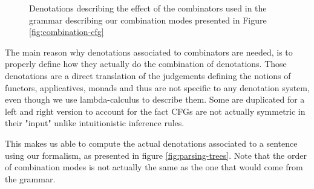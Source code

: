 \begin{figure}
	
	\caption{Denotations describing the effect of the combinators used in the
		grammar describing our combination modes presented in
		Figure \ref{fig:combination-cfg}}
	\label{fig:combinator-denotations}
\end{figure}

The main reason why denotations associated to combinators are needed, is to
properly define how they actually do the combination of denotations.
Those denotations are a direct translation of the judgements defining the
notions of functors, applicatives, monads and thus are not specific to any
denotation system, even though we use lambda-calculus to describe them.
Some are duplicated for a left and right version to account for the fact CFGs
are not actually symmetric in their "input" unlike intuitionistic inference
rules.

This makes us able to compute the actual denotations associated to a sentence
using our formalism, as presented in figure \ref{fig:parsing-trees}.
Note that the order of combination modes is not actually the same as the one
that would come from the grammar.

